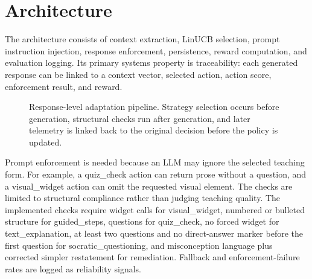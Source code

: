\documentclass[conference]{IEEEtran}
\begin{document}
\section{Architecture}

The architecture consists of context extraction, LinUCB selection, prompt instruction injection, response enforcement, persistence, reward computation, and evaluation logging. Its primary systems property is traceability: each generated response can be linked to a context vector, selected action, action score, enforcement result, and reward.

\begin{figure}[htbp]
\centering
{}
\caption{Response-level adaptation pipeline. Strategy selection occurs before generation, structural checks run after generation, and later telemetry is linked back to the original decision before the policy is updated.}
\label{fig:pipeline}
\end{figure}

Prompt enforcement is needed because an LLM may ignore the selected teaching form. For example, a quiz\_check action can return prose without a question, and a visual\_widget action can omit the requested visual element. The checks are limited to structural compliance rather than judging teaching quality. The implemented checks require widget calls for visual\_widget, numbered or bulleted structure for guided\_steps, questions for quiz\_check, no forced widget for text\_explanation, at least two questions and no direct-answer marker before the first question for socratic\_questioning, and misconception language plus corrected simpler restatement for remediation. Fallback and enforcement-failure rates are logged as reliability signals.
\end{document}

